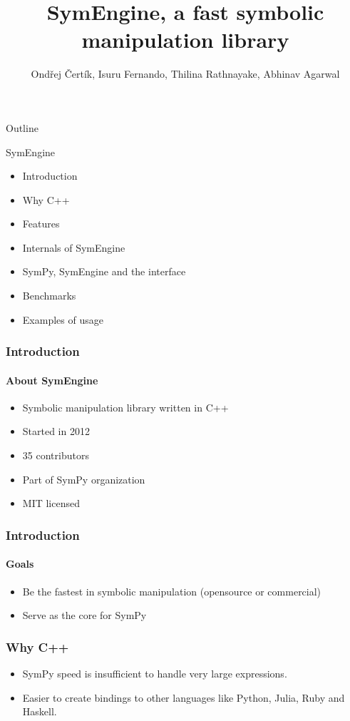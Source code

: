 \documentclass{beamer}
\title[SymEngine \hspace{14em}\insertframenumber/
\inserttotalframenumber]{SymEngine, a fast symbolic manipulation library}
\author[O. Čertík, I. Fernando, ...]{Ondřej Čertík, Isuru Fernando, Thilina Rathnayake, Abhinav Agarwal}
\begin{document}
\begin{frame}
\maketitle
\end{frame}


\begin{frame}{Outline}
\begin{block}{SymEngine}
\begin{itemize}
\item Introduction
\item Why C++
\item Features
\item Internals of SymEngine
\item SymPy, SymEngine and the interface
\item Benchmarks
\item Examples of usage
\end{itemize}
\end{block}
\end{frame}


\begin{frame}
\frametitle{Introduction}
\framesubtitle{About SymEngine}
\begin{itemize}
\item Symbolic manipulation library written in C++
\item Started in 2012
\item 35 contributors
\item Part of SymPy organization
\item MIT licensed
\end{itemize}
\end{frame}


\begin{frame}
\frametitle{Introduction}
\framesubtitle{Goals}
\begin{itemize}
\item Be the fastest in symbolic manipulation (opensource or commercial)
\item Serve as the core for SymPy
\end{itemize}
\end{frame}


\begin{frame}
\frametitle{Why C++}
\begin{itemize}
\item SymPy speed is insufficient to handle very large expressions.
\item Easier to create bindings to other languages like Python, Julia, Ruby and Haskell.
\end{itemize}
\end{frame}
\end{document}
